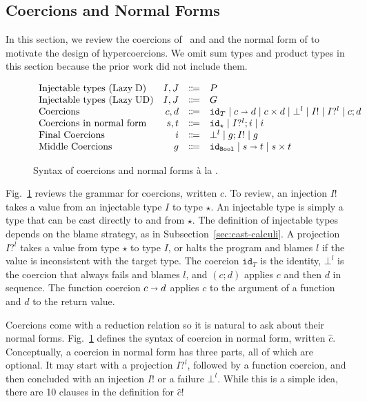 \documentclass[runningheads]{llncs}
\newcommand{\stxrule}[3]{\text{#2} & #1 & \Coloneqq & #3\\}
\newcommand{\figref}[1]{Fig.~\ref{#1}}
\newcommand{\LUD}{\ensuremath{\text{Lazy\;UD}}}
\newcommand{\LD}{\ensuremath{\text{Lazy\;D}}}
\newcommand{\Tdyn}[0]{\ensuremath{\star}}
\newcommand{\Pbool}[0]{\ensuremath{\mathtt{Bool}}}
\newcommand{\Pfunc}[2]{\ensuremath{#1 \shortrightarrow #2}}
\newcommand{\Pprod}[2]{\ensuremath{#1 \times #2}}
\newcommand{\cnfproj}[2]{#1?^{#2}}
\newcommand{\cnfinj}[1]{#1!}
\newcommand{\cnfseq}[2]{#1;#2}
\newcommand{\cnffail}[1]{\bot^{#1}}
\newcommand{\cnffunc}[2]{\Pfunc{#1}{#2}}
\newcommand{\cnfprod}[2]{\Pprod{#1}{#2}}
\newcommand{\cnfid}[1]{\ensuremath{\mathtt{id}_{#1}}}
\begin{document}
\subsection{Coercions and Normal Forms} 
\label{sec:coercions}

In this section, we review the coercions
of~\citet{henglein1994dynamic} and \citet{herman2010space} and the
normal form of \citet{siek2012interpretations} to motivate the design
of hypercoercions.  We omit sum types and product types in this
section because the prior work did not include them.

\begin{figure}[tp]
	\[
	\begin{array}{lrcl}
	\stxrule{I,J}{Injectable types (\LD)}{P}
	\stxrule{I,J}{Injectable types (\LUD)}{G}
	\stxrule{c,d}{Coercions}{
		\cnfid{T}       \mid
		\cnffunc{c}{d}  \mid
		\cnfprod{c}{d}  \mid
		\cnffail{l}     \mid
		\cnfinj{I}      \mid
		\cnfproj{I}{l}  \mid
		\cnfseq{c}{d}
	}
	\stxrule{s,t}{Coercions in normal form}{
		\cnfid{\Tdyn}       \mid
		\cnfseq{\cnfproj{I}{l}}{i} \mid
		i
	}
	\stxrule{i}{Final Coercions}{
		\cnffail{l} \mid
		\cnfseq{g}{\cnfinj{I}} \mid
		g
	}
	\stxrule{g}{Middle Coercions}{
		\cnfid{\Pbool} \mid
		\cnffunc{s}{t} \mid
		\cnfprod{s}{t}
	}
	\end{array}
	\]
	\caption{Syntax of coercions and normal forms {\`a} la 
		\citet{siek2012interpretations}.}
	\label{fig:normal-coercion}
\end{figure}

\figref{fig:normal-coercion} reviews the grammar for coercions,
written $c$.
%
To review, an injection $\cnfinj{I}$ takes a value from an injectable type
$I$ to type $\Tdyn$. An injectable type is simply a type that can be
cast directly to and from $\Tdyn$. The
definition of injectable types depends on the blame strategy, as in 
Subsection~\ref{sec:cast-calculi}.
%
A projection $I?^l$ takes a value from type $\Tdyn$ to type $I$, or
halts the program and blames $l$ if the value is inconsistent with 
the target type.
The coercion \cnfid{T} is the identity, $\bot^{l}$ is the coercion that
always fails and blames $l$, and $(\cnfseq{c}{d})$ applies $c$ and
then $d$ in sequence. The function coercion $\cnffunc{c}{d}$
applies $c$ to the argument of a function and $d$ to the return
value.

Coercions come with a reduction relation so it is natural to ask about
their normal forms. \figref{fig:normal-coercion} defines the syntax of
coercion in normal form, written $\hat{c}$.
Conceptually, a coercion
in normal form has three parts, all of which are optional.  It may
start with a projection $I?^l$, followed by a function coercion, and
then concluded with an injection $I!$ or a failure $\bot^l$. While
this is a simple idea, there are 10 clauses in the definition for
$\hat{c}$!
\end{document}
